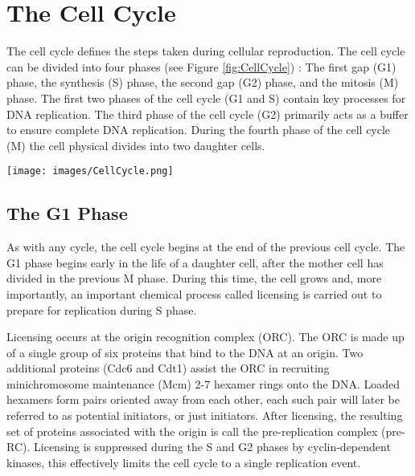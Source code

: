	\section{The Cell Cycle}
	\label{sec:CellCycle}
	
	The cell cycle defines the steps taken during cellular reproduction.
	The cell cycle can be divided into four phases (see Figure \ref{fig:CellCycle}) \cite{CellMolApproach,MolecularBiology}:
	The first gap (G1) phase, the synthesis (S) phase, the second gap (G2) phase, and the mitosis (M) phase.
	The first two phases of the cell cycle (G1 and S) contain key processes for DNA replication.
	The third phase of the cell cycle (G2) primarily acts as a buffer to ensure complete DNA replication.
	During the fourth phase of the cell cycle (M) the cell physical divides into two daughter cells.
	
	\begin{SCfigure}[1][thb]
		\texttt{[image: images/CellCycle.png]}
		\caption[Cell Cycle]{\label{fig:CellCycle} The complete cell cycle is made up of four phases: 
			The Mitosis (M) phase, when a mother cell separates into two daughter cells. 
			The first Gap (G1) phase, when the daughter cell undergoes growth and chemical preparation for DNA replication.
			The Synthesis (S) phase, when the DNA is replicated.
			And the second Gap (G2) phase which acts as a buffer to ensure complete replication before the M phase.}
	\end{SCfigure}
	
		\subsection{The G1 Phase}
		\label{subsec:G1Phase}
		
		As with any cycle, the cell cycle begins at the end of the previous cell cycle.
		The G1 phase begins early in the life of a daughter cell, after the mother cell has divided in the previous M phase.
		During this time, the cell grows and, more importantly, an important chemical process called licensing is carried out to prepare for replication during S phase.
		
		Licensing occurs at the origin recognition complex (ORC).
		The ORC is made up of a single group of six proteins that bind to the DNA at an origin.
		Two additional proteins (Cdc6 and Cdt1) assist the ORC in recruiting minichromosome maintenance (Mcm) 2-7 hexamer rings onto the DNA.
		Loaded hexamers form pairs oriented away from each other, each such pair will later be referred to as potential initiators, or just initiators.
		After licensing, the resulting set of proteins associated with the origin is call the pre-replication complex (pre-RC).
		Licensing is suppressed during the S and G2 phases by cyclin-dependent kinases, this effectively limits the cell cycle to a single replication event. \cite{MolecularCellBiology}
		
